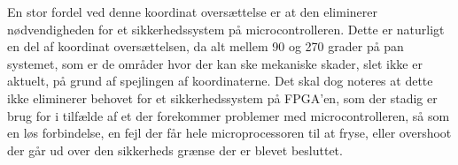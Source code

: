 En stor fordel ved denne koordinat oversættelse er at den eliminerer nødvendigheden for et sikkerhedssystem på microcontrolleren. Dette er naturligt en del af koordinat oversættelsen, da alt mellem 90 og 270 grader på pan systemet, som er de områder hvor der kan ske mekaniske skader, slet ikke er aktuelt, på grund af spejlingen af koordinaterne. Det skal dog noteres at dette ikke eliminerer behovet for et sikkerhedssystem på FPGA'en, som der stadig er brug for i tilfælde af et der forekommer problemer med microcontrolleren, så som en løs forbindelse, en fejl der får hele microprocessoren til at fryse, eller overshoot der går ud over den sikkerheds grænse der er blevet besluttet.




















